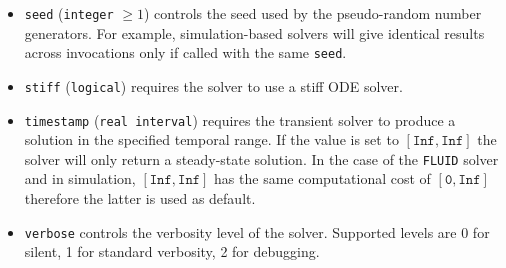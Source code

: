 \begin{itemize}
\item \texttt{seed} (\texttt{integer} $\geq 1$) controls the seed used by the pseudo-random number generators. For example, simulation-based solvers will give identical results across invocations only if called with the same \texttt{seed}.

\item \texttt{stiff} (\texttt{logical}) requires the solver to use a stiff ODE solver.

\item \texttt{timestamp} (\texttt{real interval}) requires the transient solver to produce a solution in the specified temporal range. If the value is set to $[\texttt{Inf},\texttt{Inf}]$ the solver will only return a steady-state solution. In the case of the \texttt{FLUID} solver and in simulation, $[\texttt{Inf},\texttt{Inf}]$ has the same computational cost of $[\texttt{0},\texttt{Inf}]$ therefore the latter is used as default.

\item \texttt{verbose} controls the verbosity level of the solver. Supported levels are 0 for silent, 1 for standard verbosity, 2 for debugging.
\end{itemize}

